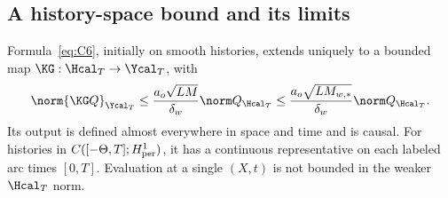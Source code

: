 \subsection{A history-space bound and its limits}
\begin{theorem}\label{thm:observation}
Formula~\eqref{eq:C6}, initially on smooth histories, extends uniquely to a bounded map $\KG:\Hcal_T\to\Ycal_T$, with
\begin{equation}\label{eq:Kbound}
\norm{\KG Q}_{\Ycal_T}\le\frac{a_o\sqrt{LM}}{\delta_w}\norm Q_{\Hcal_T}
\le\frac{a_o\sqrt{LM_{w,*}}}{\delta_w}\norm Q_{\Hcal_T}.
\end{equation}
Its output is defined almost everywhere in space and time and is causal. For histories in $C([-\Theta,T];H^1_{\rm per})$, it has a continuous representative on each labeled arc times $[0,T]$. Evaluation at a single $(X,t)$ is not bounded in the weaker $\Hcal_T$ norm.
\end{theorem}

